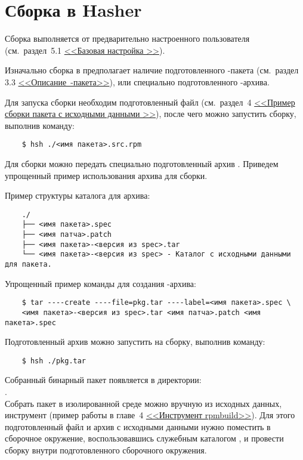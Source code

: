 \section{Сборка в Hasher}
Сборка выполняется от предварительно настроенного пользователя
(см.~раздел~5.1 \hyperlink{5.1}{<<Базовая настройка >>}).

Изначально сборка в  предполагает наличие подготовленного -пакета
(см.~раздел 3.3 \hyperlink{rpm-pack-desc}{\mbox{<<Описание -пакета>>}}),
или специально подготовленного -архива.

Для запуска сборки необходим подготовленный файл  (см.~раздел~4
\hyperlink{rpmbuild-exampl-src}{<<Пример сборки пакета с исходными данными >>}),
после чего можно запустить сборку, выполнив команду:

\begin{verbatim}
	$ hsh ./<имя пакета>.src.rpm
\end{verbatim}

Для сборки можно передать специально подготовленный архив . Приведем упрощенный пример
использования архива для сборки.

Пример структуры каталога для архива:
\begin{verbatim}
	./
	├── <имя пакета>.spec
	├── <имя патча>.patch
	├── <имя пакета>-<версия из spec>.tar
	└── <имя пакета>-<версия из spec> - Каталог с исходными данными для пакета.
\end{verbatim}

Упрощенный пример команды для создания -архива:
\begin{verbatim}
	$ tar ----create ----file=pkg.tar ----label=<имя пакета>.spec \
	<имя пакета>-<версия из spec>.tar <имя патча>.patch <имя пакета>.spec
\end{verbatim}

Подготовленный архив можно запустить на сборку, выполнив команду:
\begin{verbatim}
	$ hsh ./pkg.tar
\end{verbatim}

Собранный бинарный пакет появляется в директории:\\ .\\

Собрать пакет в изолированной среде можно вручную из исходных данных, инструмент  (пример работы
в главе~4  \hyperlink{rpmbuild}{<<Инструмент rpmbuild>>}). Для этого подготовленный файл \Sys{.spec} и архив
с исходными данными нужно поместить в сборочное окружение, воспользовавшись служебным каталогом
\Sys{$\sim$/hasher/chroot/.in}, и провести сборку \Sys{rpmbuild} внутри подготовленного сборочного окружения.

